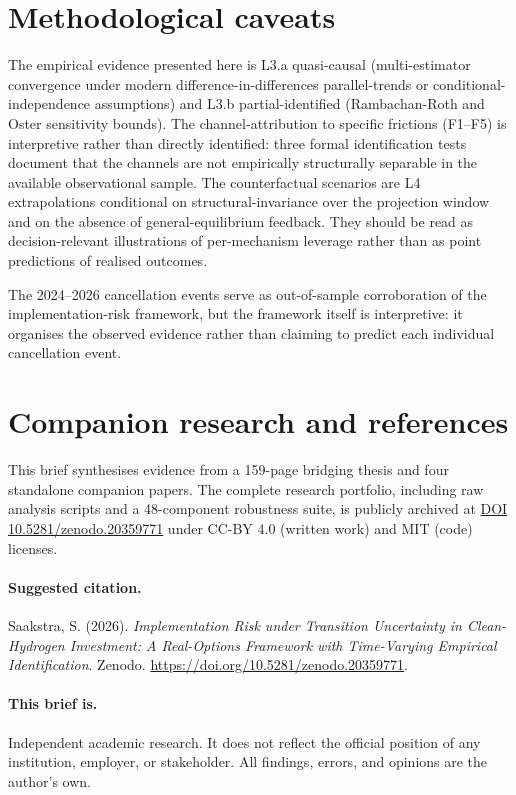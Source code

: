 \documentclass[11pt,a4paper]{article}
\begin{document}
\section{Methodological caveats}

The empirical evidence presented here is L3.a quasi-causal (multi-estimator convergence under modern difference-in-differences parallel-trends or conditional-independence assumptions) and L3.b partial-identified (Rambachan-Roth and Oster sensitivity bounds). The channel-attribution to specific frictions (F1--F5) is interpretive rather than directly identified: three formal identification tests \cite{saakstra2026thesis} document that the channels are not empirically structurally separable in the available observational sample. The counterfactual scenarios are L4 extrapolations conditional on structural-invariance over the projection window and on the absence of general-equilibrium feedback. They should be read as decision-relevant illustrations of per-mechanism leverage rather than as point predictions of realised outcomes.

The 2024--2026 cancellation events serve as out-of-sample corroboration of the implementation-risk framework, but the framework itself is interpretive: it organises the observed evidence rather than claiming to predict each individual cancellation event.

\section{Companion research and references}

This brief synthesises evidence from a 159-page bridging thesis and four standalone companion papers. The complete research portfolio, including raw analysis scripts and a 48-component robustness suite, is publicly archived at \href{https://doi.org/10.5281/zenodo.20359771}{DOI 10.5281/zenodo.20359771} under CC-BY 4.0 (written work) and MIT (code) licenses.

\paragraph{Suggested citation.} Saakstra, S. (2026). \emph{Implementation Risk under Transition Uncertainty in Clean-Hydrogen Investment: A Real-Options Framework with Time-Varying Empirical Identification}. Zenodo. \href{https://doi.org/10.5281/zenodo.20359771}{https://doi.org/10.5281/zenodo.20359771}.

\paragraph{This brief is.} Independent academic research. It does not reflect the official position of any institution, employer, or stakeholder. All findings, errors, and opinions are the author's own.
\end{document}

